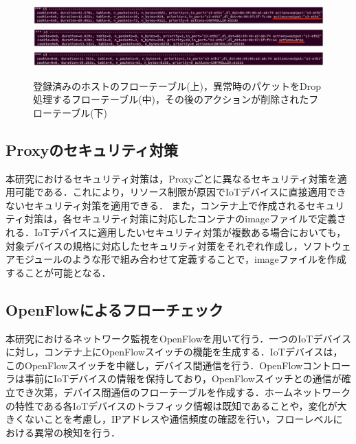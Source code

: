 \documentclass[a4paper,10pt,twocolumn,uplatex]{jsarticle}
\begin{document}
\begin{figure}[!tb]
  \centering
  \includegraphics[width=\linewidth]{img/result_flow4v3.eps}
  \includegraphics[width=\linewidth]{img/result_flow2v3.eps}
  \includegraphics[width=\linewidth]{img/result_flow3v2.eps}
  \caption{登録済みのホストのフローテーブル(上)，異常時のパケットをDrop処理するフローテーブル(中)，その後のアクションが削除されたフローテーブル(下)}
  \label{fig:result1}
\end{figure}

\subsection{Proxyのセキュリティ対策}
本研究におけるセキュリティ対策は，Proxyごとに異なるセキュリティ対策を適用可能である．これにより，リソース制限が原因でIoTデバイスに直接適用できないセキュリティ対策を適用できる．
また，コンテナ上で作成されるセキュリティ対策は，各セキュリティ対策に対応したコンテナのimageファイルで定義される．IoTデバイスに適用したいセキュリティ対策が複数ある場合においても，対象デバイスの規格に対応したセキュリティ対策をそれぞれ作成し，ソフトウェアモジュールのような形で組み合わせて定義することで，imageファイルを作成することが可能となる．

\subsection{OpenFlowによるフローチェック}
本研究におけるネットワーク監視をOpenFlowを用いて行う．一つのIoTデバイスに対し，コンテナ上にOpenFlowスイッチの機能を生成する．IoTデバイスは，このOpenFlowスイッチを中継し，デバイス間通信を行う．OpenFlowコントローラは事前にIoTデバイスの情報を保持しており，OpenFlowスイッチとの通信が確立でき次第，デバイス間通信のフローテーブルを作成する．ホームネットワークの特性である各IoTデバイスのトラフィック情報は既知であることや，変化が大きくないことを考慮し，IPアドレスや通信頻度の確認を行い，フローレベルにおける異常の検知を行う．
\end{document}
